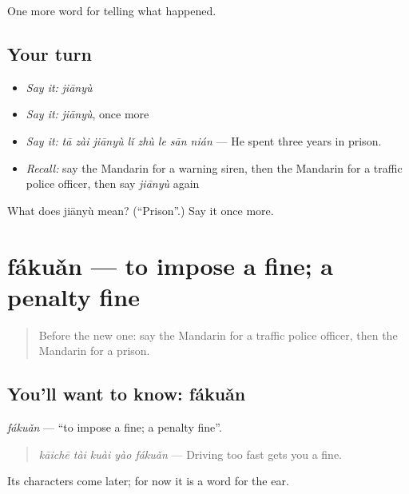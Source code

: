 \begin{grammarlens}[title={What you've built}]
One more word for telling what happened.
\end{grammarlens}

\subsection*{Your turn}
\begin{itemize}
\raggedright
  \item \emph{Say it:} \emph{jiānyù}
  \item \emph{Say it:} \emph{jiānyù}, once more
  \item \emph{Say it:} \emph{tā zài jiānyù lǐ zhù le sān nián} — He spent three years in prison.
  \item \emph{Recall:} say the Mandarin for a warning siren, then the Mandarin for a traffic police officer, then say \emph{jiānyù} again
\end{itemize}

\begin{tcolorbox}[breakable,colback=teal!4,colframe=teal!35!black,title={Before you move on}]
What does jiānyù mean? (\textquotedblleft{}Prison\textquotedblright{}.) Say it once more.
\end{tcolorbox}
\section[fákuǎn]{fákuǎn — to impose a fine; a penalty fine}

\label{lesson:ZH-C312-fakuan}



\begin{quote}
Before the new one: say the Mandarin for a traffic police officer, then the Mandarin for a prison.
\end{quote}

\subsection*{You'll want to know: fákuǎn}
\emph{fákuǎn} — \textquotedblleft{}to impose a fine; a penalty fine\textquotedblright{}.

\begin{quote}
\emph{kāichē tài kuài yào fákuǎn} — Driving too fast gets you a fine.
\end{quote}

Its characters come later; for now it is a word for the ear.

